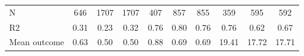 \begin{tabular}{lccc|ccc|ccc}
N           &         646         &        1707         &        1707         &         407         &         857         &         855         &         359         &         595         &         592         \\
R2          &        0.31         &        0.23         &        0.32         &        0.76         &        0.80         &        0.76         &        0.76         &        0.62         &        0.67         \\
Mean outcome&        0.63         &        0.50         &        0.50         &        0.88         &        0.69         &        0.69         &       19.41         &       17.72         &       17.71         \\
\bottomrule \end{tabular}
